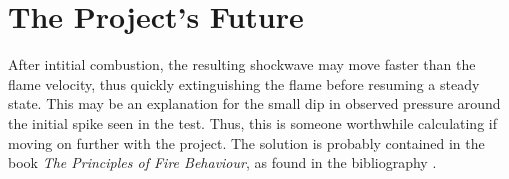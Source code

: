 \chapter{The Project's Future}

After intitial combustion, the resulting shockwave may move faster than the flame velocity, thus quickly extinguishing the flame before resuming a steady state. This may be an explanation for the small dip in observed pressure around the initial spike seen in the test. Thus, this is someone worthwhile calculating if moving on further with the project. The solution is probably contained in the book \emph{The Principles of Fire Behaviour}, as found in the bibliography \cite{principlesoffire}.

